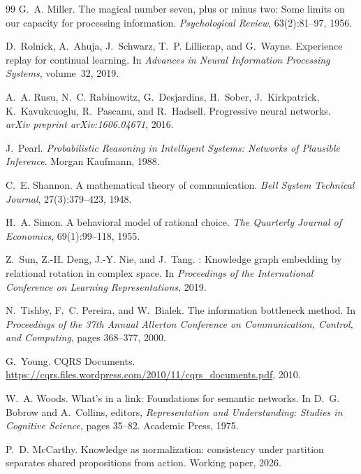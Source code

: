 \documentclass[11pt]{article}
\theoremstyle{definition}
\begin{document}
\begin{thebibliography}{99}
G.~A. Miller.
\newblock The magical number seven, plus or minus two: Some limits on our
  capacity for processing information.
\newblock \emph{Psychological Review}, 63(2):81--97, 1956.

D.~Rolnick, A.~Ahuja, J.~Schwarz, T.~P. Lillicrap, and G.~Wayne.
\newblock Experience replay for continual learning.
\newblock In \emph{Advances in Neural Information Processing Systems},
  volume~32, 2019.

A.~A. Rusu, N.~C. Rabinowitz, G.~Desjardins, H.~Sober, J.~Kirkpatrick,
  K.~Kavukcuoglu, R.~Pascanu, and R.~Hadsell.
\newblock Progressive neural networks.
\newblock \emph{arXiv preprint arXiv:1606.04671}, 2016.

J.~Pearl.
\newblock \emph{Probabilistic Reasoning in Intelligent Systems: Networks of
  Plausible Inference}.
\newblock Morgan Kaufmann, 1988.

C.~E. Shannon.
\newblock A mathematical theory of communication.
\newblock \emph{Bell System Technical Journal}, 27(3):379--423, 1948.

H.~A. Simon.
\newblock A behavioral model of rational choice.
\newblock \emph{The Quarterly Journal of Economics}, 69(1):99--118, 1955.

Z.~Sun, Z.-H. Deng, J.-Y. Nie, and J.~Tang.
: Knowledge graph embedding by relational rotation in complex
  space.
\newblock In \emph{Proceedings of the International Conference on Learning
  Representations}, 2019.

N.~Tishby, F.~C. Pereira, and W.~Bialek.
\newblock The information bottleneck method.
\newblock In \emph{Proceedings of the 37th Annual Allerton Conference on
  Communication, Control, and Computing}, pages 368--377, 2000.

G.~Young.
\newblock CQRS Documents.
\newblock \url{https://cqrs.files.wordpress.com/2010/11/cqrs_documents.pdf}, 2010.

W.~A. Woods.
\newblock What's in a link: Foundations for semantic networks.
\newblock In D.~G. Bobrow and A.~Collins, editors, \emph{Representation and
  Understanding: Studies in Cognitive Science}, pages 35--82. Academic Press,
  1975.

P.~D. McCarthy.
\newblock Knowledge as normalization: consistency under partition separates
  shared propositions from action.
\newblock Working paper, 2026.


\end{thebibliography}
\end{document}
